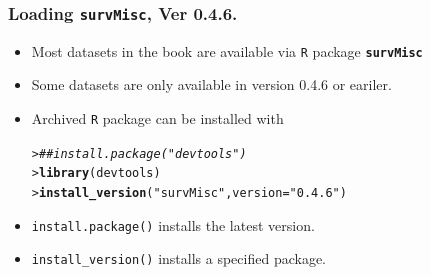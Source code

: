 \documentclass[10pt]{beamer}\usepackage[]{graphicx}\usepackage[]{color}
\makeatletter
\newcommand{\hlstr}[1]{\textcolor[rgb]{0.192,0.494,0.8}{#1}}%
\newcommand{\hlcom}[1]{\textcolor[rgb]{0.678,0.584,0.686}{\textit{#1}}}%
\newcommand{\hlstd}[1]{\textcolor[rgb]{0.345,0.345,0.345}{#1}}%
\newcommand{\hlkwc}[1]{\textcolor[rgb]{0.333,0.667,0.333}{#1}}%
\newcommand{\hlkwd}[1]{\textcolor[rgb]{0.737,0.353,0.396}{\textbf{#1}}}%
\newenvironment{kframe}{%
 \def\at@end@of@kframe{}%
 \ifinner\ifhmode%
  \def\at@end@of@kframe{\end{minipage}}%
  \begin{minipage}{\columnwidth}%
 \fi\fi%
 \def\FrameCommand##1{\hskip\@totalleftmargin \hskip-\fboxsep
 \colorbox{shadecolor}{##1}\hskip-\fboxsep
     \hskip-\linewidth \hskip-\@totalleftmargin \hskip\columnwidth}%
 \MakeFramed {\advance\hsize-\width
   \@totalleftmargin\z@ \linewidth\hsize
   \@setminipage}}%
 {\par\unskip\endMakeFramed%
 \at@end@of@kframe}
\newenvironment{knitrout}{}{} %
\renewenvironment{knitrout}{\setlength{\topsep}{-.2mm}}{}
\newcommand{\pkg}[1]{{\textbf{\texttt{#1}}}}
\newcommand{\R}{\texttt{R} }%
\makeatother
\begin{document}
\begin{frame}[fragile]
  \frametitle{Loading \texttt{survMisc}, Ver 0.4.6.}
  \begin{itemize}
  \item Most datasets in the book are available via \R package \pkg{survMisc} 
  \item Some datasets are only available in version 0.4.6 or eariler. 
  \item Archived \R package can be installed with
\begin{knitrout}\scriptsize
{}\color{fgcolor}\begin{kframe}
\begin{alltt}
\hlstd{> }\hlcom{## install.package("devtools")}
\hlstd{> }\hlkwd{library}\hlstd{(devtools)}
\hlstd{> }\hlkwd{install_version}\hlstd{(}\hlstr{"survMisc"}\hlstd{,} \hlkwc{version} \hlstd{=} \hlstr{"0.4.6"}\hlstd{)}
\end{alltt}
\end{kframe}
\end{knitrout}
  \item \texttt{install.package()} installs the latest version.
  \item \texttt{install\_version()} installs a specified package.
  \end{itemize}
\end{frame}
\end{document}
